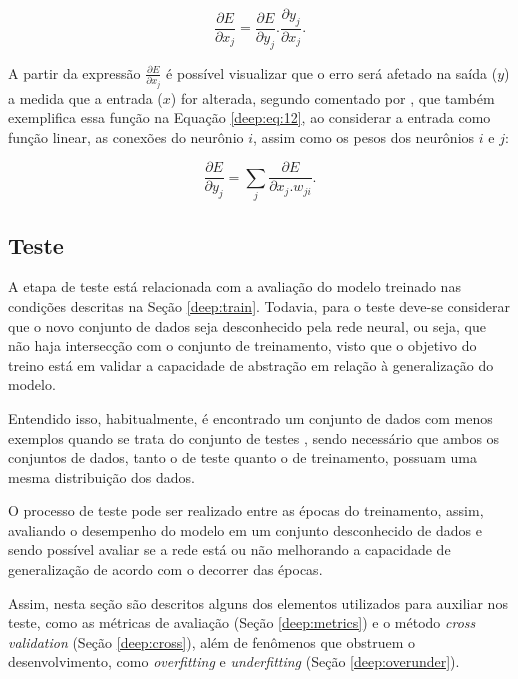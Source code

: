 \begin{equation}
    \label{deep:eq:11}
    \frac{\partial E}{\partial x_j} = \frac{\partial E}{\partial y_j} . \frac{\partial y_j}{\partial x_j}.
\end{equation}

A partir da expressão $\frac{\partial E}{\partial x_j}$ é possível visualizar que o erro será afetado na saída ($y$) a medida que a entrada ($x$) for alterada, segundo comentado por \cite{rumelhart1986learning}, que também exemplifica essa função na Equação \ref{deep:eq:12}, ao considerar a entrada como função linear, as conexões do neurônio $i$, assim como os pesos dos neurônios $i$ e $j$:

\begin{equation}
    \label{deep:eq:12}
    \frac{\partial E}{\partial y_j} = \sum_j \frac{\partial E}{\partial x_j . w_{ji}}.
\end{equation}


\subsection{Teste}
\label{deep:test}

A etapa de teste está relacionada com a avaliação do modelo treinado nas condições descritas na Seção \ref{deep:train}. Todavia, para o teste deve-se considerar que o novo conjunto de dados seja desconhecido pela rede neural, ou seja, que não haja intersecção com o conjunto de treinamento, visto que o objetivo do treino está em validar a capacidade de abstração em relação à generalização do modelo.

Entendido isso, habitualmente, é encontrado um conjunto de dados com menos exemplos quando se trata do conjunto de testes \citep{Goodfellow2016}, sendo necessário que ambos os conjuntos de dados, tanto o de teste quanto o de treinamento, possuam uma mesma distribuição dos dados.

O processo de teste pode ser realizado entre as épocas do treinamento, assim, avaliando o desempenho do modelo em um conjunto desconhecido de dados e sendo possível avaliar se a rede está ou não melhorando a capacidade de generalização de acordo com o decorrer das épocas.

Assim, nesta seção são descritos alguns dos elementos utilizados para auxiliar nos teste, como as métricas de avaliação (Seção \ref{deep:metrics}) e o método \textit{cross validation} (Seção \ref{deep:cross}), além de fenômenos que obstruem o desenvolvimento, como \textit{overfitting} e \textit{underfitting} (Seção \ref{deep:overunder}).



